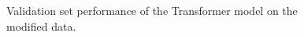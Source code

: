 \documentclass[bsc,frontabs,singlespacing,parskip,deptreport]{infthesis}
\begin{document}
\begin{figure}
\begin{center}
\setlength{\belowcaptionskip}{0pt}
\caption{Validation set performance of the Transformer model on the modified data.}
\end{center}
\end{figure}
\end{document}
